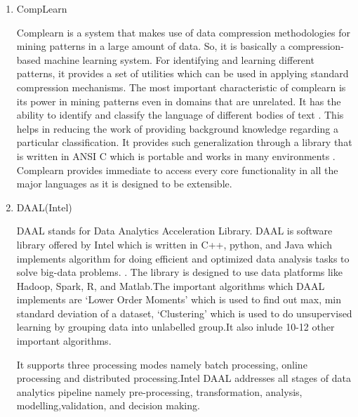 \begin{enumerate}
\item {} 
CompLearn

Complearn is a system that makes use of data compression
methodologies for mining patterns in a large amount of data. So,
it is basically a compression-based machine learning system. For
identifying and learning different patterns, it provides a set of
utilities which can be used in applying standard compression
mechanisms. The most important characteristic of complearn is its
power in mining patterns even in domains that are unrelated. It
has the ability to identify and classify the language of different
bodies of text \label{\detokenize{i524/technologies:id95}}{\hyperref[\detokenize{i524/technologies:comp1}]{\sphinxcrossref{{[}86{]}}}}. This helps in reducing the work of
providing background knowledge regarding a particular
classification. It provides such generalization through a library
that is written in ANSI C which is portable and works in many
environments \label{\detokenize{i524/technologies:id96}}{\hyperref[\detokenize{i524/technologies:comp1}]{\sphinxcrossref{{[}86{]}}}}. Complearn provides immediate to access
every core functionality in all the major languages as it is
designed to be extensible.

\item {} 
DAAL(Intel)

DAAL stands for Data Analytics Acceleration Library. DAAL is
software library offered by Intel which is written in C++, python,
and Java which implements algorithm for doing efficient and
optimized data analysis tasks to solve big-data
problems. \label{\detokenize{i524/technologies:id97}}{\hyperref[\detokenize{i524/technologies:www-daal-wiki}]{\sphinxcrossref{{[}87{]}}}}. The library is designed to use
data platforms like Hadoop, Spark, R, and Matlab.The important
algorithms which DAAL implements are `Lower Order Moments' which
is used to find out max, min standard deviation of a dataset,
`Clustering' which is used to do unsupervised learning by grouping
data into unlabelled group.It also inlude 10-12 other important
algorithms.

\label{\detokenize{i524/technologies:id98}}{\hyperref[\detokenize{i524/technologies:www-daal-official}]{\sphinxcrossref{{[}88{]}}}} It supports three processing modes
namely batch processing, online processing and distributed
processing.Intel DAAL addresses all stages of data analytics
pipeline namely pre-processing, transformation, analysis,
modelling,validation, and decision making.


\end{enumerate}
